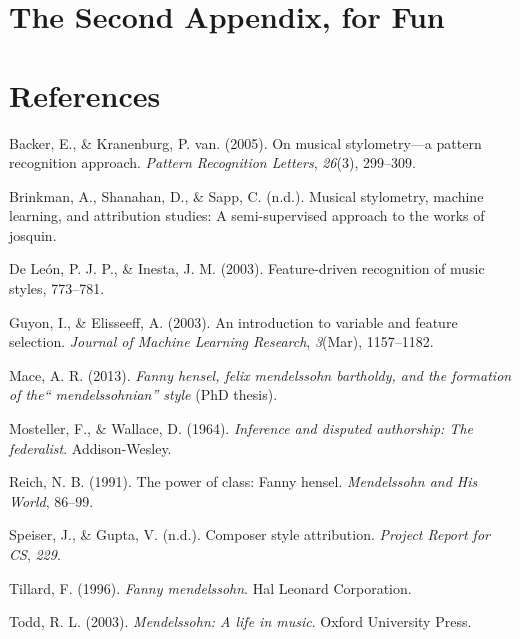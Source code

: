 \documentclass[12pt,twoside]{reedthesis}
\theoremstyle{definition}
\theoremstyle{definition}
\theoremstyle{definition}
\theoremstyle{remark}
\begin{document}
\chapter{The Second Appendix, for
Fun}\label{the-second-appendix-for-fun}

\backmatter

\chapter*{References}\label{references}


\noindent

\setlength{\parindent}{-0.20in} \setlength{\leftskip}{0.20in}
\setlength{\parskip}{8pt}

\hypertarget{refs}{}
\hypertarget{ref-backer2005}{}
Backer, E., \& Kranenburg, P. van. (2005). On musical stylometry---a
pattern recognition approach. \emph{Pattern Recognition Letters},
\emph{26}(3), 299--309.

\hypertarget{ref-brinkman2016}{}
Brinkman, A., Shanahan, D., \& Sapp, C. (n.d.). Musical stylometry,
machine learning, and attribution studies: A semi-supervised approach to
the works of josquin.

\hypertarget{ref-de2003feature}{}
De León, P. J. P., \& Inesta, J. M. (2003). Feature-driven recognition
of music styles, 773--781.

\hypertarget{ref-guyon2003}{}
Guyon, I., \& Elisseeff, A. (2003). An introduction to variable and
feature selection. \emph{Journal of Machine Learning Research},
\emph{3}(Mar), 1157--1182.

\hypertarget{ref-mace2013}{}
Mace, A. R. (2013). \emph{Fanny hensel, felix mendelssohn bartholdy, and
the formation of the`` mendelssohnian'' style} (PhD thesis).

\hypertarget{ref-mosteller1964inference}{}
Mosteller, F., \& Wallace, D. (1964). \emph{Inference and disputed
authorship: The federalist}. Addison-Wesley.

\hypertarget{ref-reich1991}{}
Reich, N. B. (1991). The power of class: Fanny hensel. \emph{Mendelssohn
and His World}, 86--99.

\hypertarget{ref-CompStyleAttri}{}
Speiser, J., \& Gupta, V. (n.d.). Composer style attribution.
\emph{Project Report for CS}, \emph{229}.

\hypertarget{ref-tillard1996}{}
Tillard, F. (1996). \emph{Fanny mendelssohn}. Hal Leonard Corporation.

\hypertarget{ref-todd2003}{}
Todd, R. L. (2003). \emph{Mendelssohn: A life in music}. Oxford
University Press.


\end{document}
